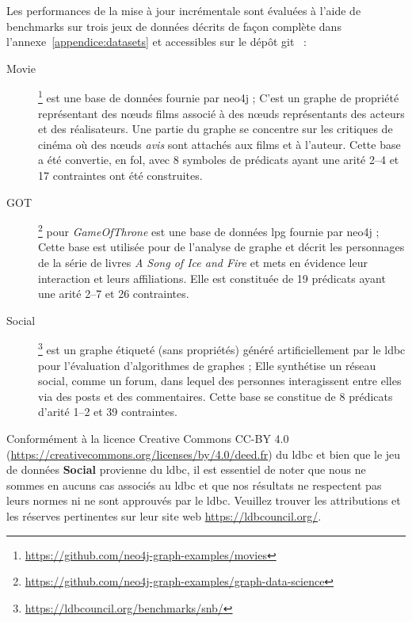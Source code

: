 Les performances de la mise à jour incrémentale sont évaluées à l'aide de benchmarks sur trois jeux de données décrits de façon complète dans l'annexe~\ref{appendice:datasets} et accessibles sur le dépôt \gls{git}~\cite{chabinUpdateChase2023} :
\begin{description}
    \item[Movie]\footnote{\url{https://github.com/neo4j-graph-examples/movies}} est une base de données fournie par \gls{neo4j} ;
          C'est un graphe de propriété représentant des nœuds films associé à des nœuds représentants des acteurs et des réalisateurs.
          Une partie du graphe se concentre sur les critiques de cinéma où des nœuds \emph{avis} sont attachés aux films et à l'auteur.
          Cette base a été convertie, en \gls{fol}, avec \num{8} symboles de prédicats ayant une arité \numrange{2}{4} et \num{17} contraintes ont été construites.
    \item[GOT]\footnote{\url{https://github.com/neo4j-graph-examples/graph-data-science}} pour \emph{GameOfThrone} est une base de données \gls{lpg} fournie par \gls{neo4j} ;
          Cette base est utilisée pour de l'analyse de graphe et décrit les personnages de la série de livres \emph{A Song of Ice and Fire} et mets en évidence leur interaction et leurs affiliations.
          Elle est constituée de \num{19} prédicats ayant une arité \numrange{2}{7} et \num{26} contraintes.
    \item[Social]\footnote{\url{https://ldbcouncil.org/benchmarks/snb/}} est un graphe étiqueté (sans propriétés) généré artificiellement par le \gls{ldbc} pour l'évaluation d'algorithmes de graphes ;
          Elle synthétise un réseau social, comme un forum, dans lequel des personnes interagissent entre elles via des posts et des commentaires.
          Cette base se constitue de \num{8} prédicats d'arité \numrange{1}{2} et \num{39} contraintes.
\end{description}

\begin{remark}
    Conformément à la licence Creative Commons CC-BY 4.0 (\url{https://creativecommons.org/licenses/by/4.0/deed.fr}) du \gls{ldbc} et bien que le jeu de données \textbf{Social} provienne du \gls{ldbc}, il est essentiel de noter que nous ne sommes en aucuns cas associés au \gls{ldbc} et que nos résultats ne respectent pas leurs normes ni ne sont approuvés par le \gls{ldbc}.
    Veuillez trouver les attributions et les réserves pertinentes sur leur site web \url{https://ldbcouncil.org/}.
\end{remark}

